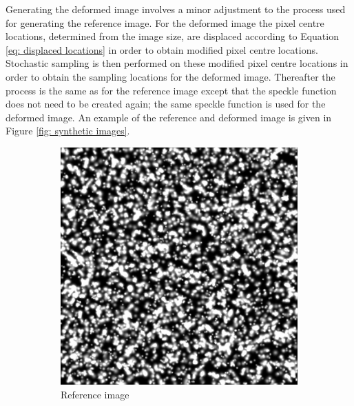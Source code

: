 \documentclass[12pt,oneside,openany,a4paper, %
english, %
masters-t, goldenblock]{usthesis}
\begin{document}
Generating the deformed image involves a minor adjustment to the process used for generating the reference image. For the deformed image the pixel centre locations, determined from the image size, are displaced according to Equation \ref{eq: displaced locations} in order to obtain modified pixel centre locations. Stochastic sampling is then performed on these modified pixel centre locations in order to obtain the sampling locations for the deformed image. Thereafter the process is the same as for the reference image except that the speckle function does not need to be created again; the same speckle function is used for the deformed image. An example of the reference and deformed image is given in Figure \ref{fig: synthetic images}.
\begin{figure}
\centering
\begin{subfigure}[t]{0.45\textwidth}
\centering
\includegraphics[scale=0.2]{image_001}
\caption{Reference image}
\label{fig: reference image synthetic}
\end{subfigure}
\hfill
\begin{subfigure}[t]{0.45\textwidth}
\centering

\end{subfigure}
\end{figure}
\end{document}
